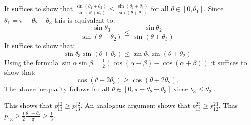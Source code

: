 \documentclass{article}
\begin{document}
It suffices to show that $\frac{\sin(\theta_1 + \theta_2)}{\sin (\theta + \theta_2)} \le \frac{\sin (\theta_1 + \theta_3)}{\sin (\theta + \theta_3)}$ for all $\theta \in [0, \theta_1]$.
Since $\theta_1 = \pi - \theta_2 - \theta_3$ this is equivalent to:
$$\frac{\sin\theta_3}{\sin (\theta + \theta_2)} \le \frac{\sin\theta_2}{\sin(\theta + \theta_3)}$$
It suffices to show that:
$$\sin\theta_3 \sin(\theta + \theta_3) \le \sin \theta_2 \sin (\theta + \theta_2)$$
Using the formula $\sin \alpha \sin \beta = \frac12(\cos(\alpha - \beta) - \cos(\alpha + \beta))$ it suffices to show that:
$$\cos(\theta + 2 \theta_3) \ge \cos(\theta + 2 \theta_2).$$
The above inequality follows for all $\theta \in [0, \pi - \theta_2 - \theta_3]$ since $\theta_3 \le \theta_2$ .

This shows that $p_{13}^{12} \ge p_{23}^{12}$. An analogous argument shows that $p_{13}^{23} \ge p_{12}^{23}$. Thus $p_{13} \ge \frac12 \frac{\theta_1 + \theta_2}{\pi} \ge \frac13$.



\end{document}
